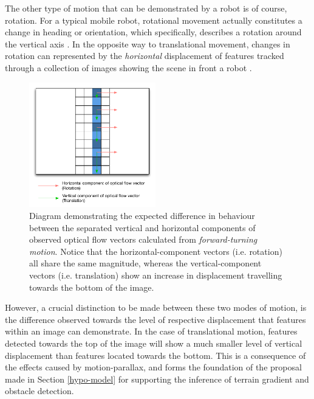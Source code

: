 The other type of motion that can be demonstrated by a robot is of course, rotation. For a typical mobile robot, rotational movement actually constitutes a change in heading or orientation, which specifically, describes a rotation around the vertical axis \cite{campbell}. In the opposite way to translational movement, changes in rotation can represented by the \textit{horizontal} displacement of features tracked through a collection of images showing the scene in front a robot \cite{labrosse}. 

\begin{figure}
\vspace{-20pt}
  \begin{center}
    \includegraphics[width=0.49\textwidth]{images/rotation_diag.pdf}
  \end{center}
  \vspace{-10pt}
  \caption{Diagram demonstrating the expected difference in behaviour between the separated vertical and horizontal components of observed optical flow vectors calculated from \textit{forward-turning motion}. Notice that the horizontal-component vectors (i.e. rotation) all share the same magnitude, whereas the vertical-component vectors (i.e. translation) show an increase in displacement travelling towards the bottom of the image.}
  \label{fig:rotation}
  \vspace{10pt}
\end{figure}

However, a crucial distinction to be made between these two modes of motion, is the difference observed towards the level of respective displacement that features within an image can demonstrate. In the case of translational motion, features detected towards the top of the image will show a much smaller level of vertical displacement than features located towards the bottom. This is a consequence of the effects caused by motion-parallax, and forms the foundation of the proposal made in Section \ref{hypo-model} for supporting the inference of terrain gradient and obstacle detection. 

